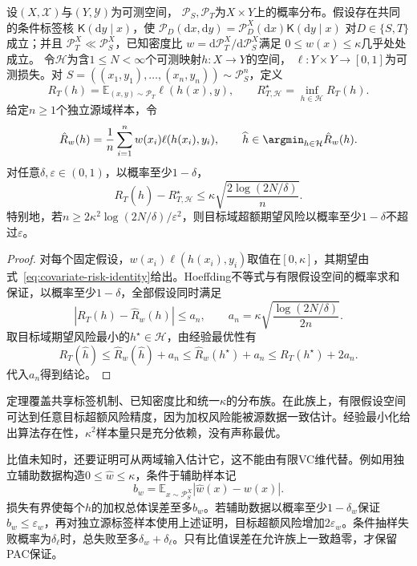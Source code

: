 \begin{theorem}[已知密度比下的迁移样本量界]
\label{thm:covariate-finite-pac}
设$(X,\mathcal X)$与$(Y,\mathcal Y)$为可测空间，
$\mathcal P_S,\mathcal P_T$为$X\times Y$上的概率分布。假设存在共同的条件标签核
$\mathsf K(\mathrm dy\mid x)$，使
$\mathcal P_D(\mathrm dx,\mathrm dy)
=\mathcal P_D^X(\mathrm dx)\mathsf K(\mathrm dy\mid x)$
对$D\in\{S,T\}$成立；并且
$\mathcal P_T^X\ll\mathcal P_S^X$，已知密度比
$w=\mathrm d\mathcal P_T^X/\mathrm d\mathcal P_S^X$满足
$0\leq w(x)\leq\kappa$几乎处处成立。
令$\mathcal H$为含$1\leq N<\infty$个可测映射$h:X\to Y$的空间，
$\ell:Y\times Y\to[0,1]$为可测损失。对
$S=((x_1,y_1),\ldots,(x_n,y_n))\sim\mathcal P_S^n$，定义
\[
 R_T(h)=\mathbb E_{(x,y)\sim\mathcal P_T}\ell(h(x),y),\qquad
 R_{T,\mathcal H}^{\star}=\inf_{h\in\mathcal H}R_T(h).
\]
给定$n\geq1$个独立源域样本，令
\[
 \hat R_w(h)=\frac1n\sum_{i=1}^n
          w(x_i)\ell(h(x_i),y_i),\qquad
 \widehat h\in\argmin_{h\in\mathcal H}\hat R_w(h).
\]
对任意$\delta,\varepsilon\in(0,1)$，以概率至少$1-\delta$，
\begin{equation}
 R_T(\widehat h)-R_{T,\mathcal H}^{\star}
 \leq\kappa\sqrt{\frac{2\log(2N/\delta)}{n}}.
 \label{eq:covariate-finite-excess}
\end{equation}
特别地，若$n\geq2\kappa^2\log(2N/\delta)/\varepsilon^2$，则目标域超额期望风险以概率至少$1-\delta$不超过$\varepsilon$。
\end{theorem}
\begin{proof}
对每个固定假设，$w(x_i)\ell(h(x_i),y_i)$取值在$[0,\kappa]$，其期望由式~\eqref{eq:covariate-risk-identity}给出。Hoeffding不等式与有限假设空间的概率求和保证，以概率至少$1-\delta$，全部假设同时满足
\[
 |R_T(h)-\hat R_w(h)|\leq
 a_n,\qquad a_n=\kappa\sqrt{\frac{\log(2N/\delta)}{2n}}.
\]
取目标域期望风险最小的$h^\star\in\mathcal H$，由经验最优性有
\[
 R_T(\widehat h)
 \leq\hat R_w(\widehat h)+a_n
 \leq\hat R_w(h^\star)+a_n
 \leq R_T(h^\star)+2a_n.
\]
代入$a_n$得到结论。
\end{proof}

定理覆盖共享标签机制、已知密度比和统一$\kappa$的分布族。在此族上，有限假设空间可达到任意目标超额风险精度，因为加权风险能被源数据一致估计。经验最小化给出算法存在性，$\kappa^2$样本量只是充分依赖，没有声称最优。

比值未知时，还要证明可从两域输入估计它，这不能由有限VC维代替。例如用独立辅助数据构造$0\leq\widehat w\leq\kappa$，条件于辅助样本记
\[
 b_w=\mathbb E_{x\sim\mathcal P_S^X}|\widehat w(x)-w(x)|.
\]
损失有界使每个$h$的加权总体误差至多$b_w$。若辅助数据以概率至少$1-\delta_w$保证$b_w\leq\varepsilon_w$，再对独立源标签样本使用上述证明，目标超额风险增加$2\varepsilon_w$。条件抽样失败概率为$\delta_\ell$时，总失败至多$\delta_w+\delta_\ell$。只有比值误差在允许族上一致趋零，才保留PAC保证。


